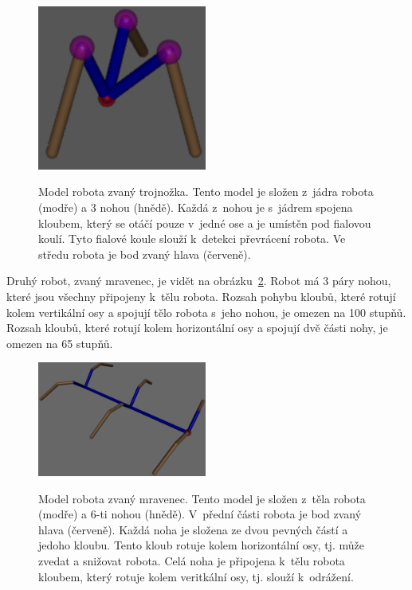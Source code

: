 \begin{figure}[h]
    \centering
    {\includegraphics[width=15em]{obrazky/trojnozka_detail.png}}
    \caption[Model robota zvaný trojnožka.]{
    Model robota zvaný trojnožka.
    Tento model je složen z~jádra robota (modře) a 3 nohou (hnědě).
    Každá z~nohou je s~jádrem spojena kloubem, který se otáčí pouze v~jedné ose a je umístěn pod fialovou koulí.
    Tyto fialové koule slouží k~detekci převrácení robota.
    Ve středu robota je bod zvaný hlava (červeně).
    }
    \label{fig:trojnozka}
\end{figure}


Druhý robot, zvaný mravenec, je vidět na obrázku~\ref{fig:mravenec}.
Robot má 3 páry nohou, které jsou všechny připojeny k~tělu robota.
Rozsah pohybu kloubů, které rotují kolem vertikální osy a spojují tělo robota s~jeho nohou, je omezen na 100 stupňů.
Rozsah kloubů, které rotují kolem horizontální osy a spojují dvě části nohy, je omezen na 65 stupňů.


\begin{figure}[h]
    \centering
    {\includegraphics[width=15em]{obrazky/mravenec_detail.png}}
    \caption[Model robota zvaný mravenec]{
    Model robota zvaný mravenec.
    Tento model je složen z~těla robota (modře) a 6-ti nohou (hnědě).
    V~přední části robota je bod zvaný hlava (červeně).
    Každá noha je složena ze dvou pevných částí a jedoho kloubu.
    Tento kloub rotuje kolem horizontální osy, tj. může zvedat a snižovat robota.
    Celá noha je připojena k~tělu robota kloubem, který rotuje kolem veritkální osy, tj. slouží k~odrážení.
    }
    \label{fig:mravenec}
\end{figure}

